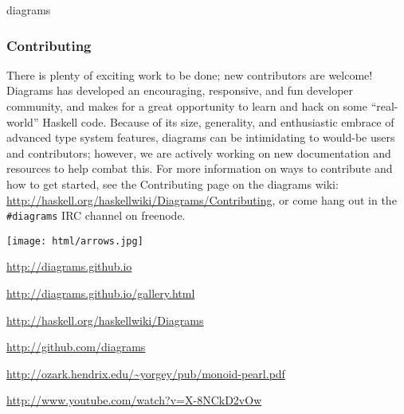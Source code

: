 \begin{hcarentry}[updated]{diagrams}
\subsubsection*{Contributing}

There is plenty of exciting work to be done; new contributors are welcome!
Diagrams has developed an encouraging, responsive, and fun developer
community, and makes for a great opportunity to learn and hack on some
``real-world'' Haskell code. Because of its size, generality, and enthusiastic
embrace of advanced type system features, diagrams can be intimidating to
would-be users and contributors; however, we are actively working on new
documentation and resources to help combat this. For more information on ways
to contribute and how to get started, see the Contributing page on the
diagrams wiki: \url{http://haskell.org/haskellwiki/Diagrams/Contributing}, or
come hang out in the \texttt{\#diagrams} IRC channel on freenode.

\begin{center}
\texttt{[image: html/arrows.jpg]}
\end{center}

\FurtherReading
\begin{compactitem}
\item \url{http://diagrams.github.io}
\item \url{http://diagrams.github.io/gallery.html}
\item \url{http://haskell.org/haskellwiki/Diagrams}
\item \url{http://github.com/diagrams}
\item \url{http://ozark.hendrix.edu/~yorgey/pub/monoid-pearl.pdf}
\item \url{http://www.youtube.com/watch?v=X-8NCkD2vOw}
\end{compactitem}
\end{hcarentry}
